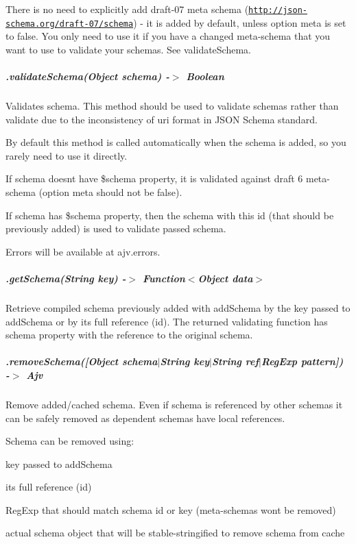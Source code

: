 There is no need to explicitly add draft-\/07 meta schema (\href{http://json-schema.org/draft-07/schema}{\tt http\+://json-\/schema.\+org/draft-\/07/schema}) -\/ it is added by default, unless option {\ttfamily meta} is set to {\ttfamily false}. You only need to use it if you have a changed meta-\/schema that you want to use to validate your schemas. See {\ttfamily validate\+Schema}.

\subparagraph*{\label{_api-validateschema}%
.validate\+Schema(\+Object schema) -\/$>$ Boolean}

Validates schema. This method should be used to validate schemas rather than {\ttfamily validate} due to the inconsistency of {\ttfamily uri} format in J\+S\+ON Schema standard.

By default this method is called automatically when the schema is added, so you rarely need to use it directly.

If schema doesn\textquotesingle{}t have {\ttfamily \$schema} property, it is validated against draft 6 meta-\/schema (option {\ttfamily meta} should not be false).

If schema has {\ttfamily \$schema} property, then the schema with this id (that should be previously added) is used to validate passed schema.

Errors will be available at {\ttfamily ajv.\+errors}.

\subparagraph*{.get\+Schema(\+String key) -\/$>$ Function$<$Object data$>$}

Retrieve compiled schema previously added with {\ttfamily add\+Schema} by the key passed to {\ttfamily add\+Schema} or by its full reference (id). The returned validating function has {\ttfamily schema} property with the reference to the original schema.

\subparagraph*{.remove\+Schema(\mbox{[}Object schema$\vert$\+String key$\vert$\+String ref$\vert$\+Reg\+Exp pattern\mbox{]}) -\/$>$ Ajv}

Remove added/cached schema. Even if schema is referenced by other schemas it can be safely removed as dependent schemas have local references.

Schema can be removed using\+:
\begin{DoxyItemize}
\item key passed to {\ttfamily add\+Schema}
\item it\textquotesingle{}s full reference (id)
\item Reg\+Exp that should match schema id or key (meta-\/schemas won\textquotesingle{}t be removed)
\item actual schema object that will be stable-\/stringified to remove schema from cache
\end{DoxyItemize}

